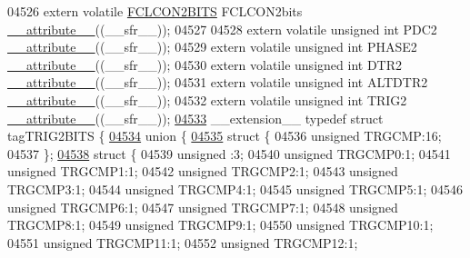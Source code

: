 \begin{DoxyCode}
04526 \textcolor{keyword}{extern} \textcolor{keyword}{volatile} \hyperlink{a00014_d3/def/a00446}{FCLCON2BITS} FCLCON2bits \hyperlink{a00015_a493c46f03454991ccc5aa7a6e1dfb2a7}{\_\_attribute\_\_}((\_\_sfr\_\_));
04527 
04528 \textcolor{keyword}{extern} \textcolor{keyword}{volatile} \textcolor{keywordtype}{unsigned} \textcolor{keywordtype}{int}  PDC2 \hyperlink{a00015_a493c46f03454991ccc5aa7a6e1dfb2a7}{\_\_attribute\_\_}((\_\_sfr\_\_));
04529 \textcolor{keyword}{extern} \textcolor{keyword}{volatile} \textcolor{keywordtype}{unsigned} \textcolor{keywordtype}{int}  PHASE2 \hyperlink{a00015_a493c46f03454991ccc5aa7a6e1dfb2a7}{\_\_attribute\_\_}((\_\_sfr\_\_));
04530 \textcolor{keyword}{extern} \textcolor{keyword}{volatile} \textcolor{keywordtype}{unsigned} \textcolor{keywordtype}{int}  DTR2 \hyperlink{a00015_a493c46f03454991ccc5aa7a6e1dfb2a7}{\_\_attribute\_\_}((\_\_sfr\_\_));
04531 \textcolor{keyword}{extern} \textcolor{keyword}{volatile} \textcolor{keywordtype}{unsigned} \textcolor{keywordtype}{int}  ALTDTR2 \hyperlink{a00015_a493c46f03454991ccc5aa7a6e1dfb2a7}{\_\_attribute\_\_}((\_\_sfr\_\_));
04532 \textcolor{keyword}{extern} \textcolor{keyword}{volatile} \textcolor{keywordtype}{unsigned} \textcolor{keywordtype}{int}  TRIG2 \hyperlink{a00015_a493c46f03454991ccc5aa7a6e1dfb2a7}{\_\_attribute\_\_}((\_\_sfr\_\_));
\hypertarget{a00015_source_l04533}{}\hyperlink{a00014}{04533} \_\_extension\_\_ \textcolor{keyword}{typedef} \textcolor{keyword}{struct }tagTRIG2BITS \{
\hypertarget{a00015_source_l04534}{}\hyperlink{a00015}{04534}   \textcolor{keyword}{union }\{
\hypertarget{a00015_source_l04535}{}\hyperlink{a00015}{04535}     \textcolor{keyword}{struct }\{
04536       \textcolor{keywordtype}{unsigned} TRGCMP:16;
04537     \};
\hypertarget{a00015_source_l04538}{}\hyperlink{a00015}{04538}     \textcolor{keyword}{struct }\{
04539       \textcolor{keywordtype}{unsigned} :3;
04540       \textcolor{keywordtype}{unsigned} TRGCMP0:1;
04541       \textcolor{keywordtype}{unsigned} TRGCMP1:1;
04542       \textcolor{keywordtype}{unsigned} TRGCMP2:1;
04543       \textcolor{keywordtype}{unsigned} TRGCMP3:1;
04544       \textcolor{keywordtype}{unsigned} TRGCMP4:1;
04545       \textcolor{keywordtype}{unsigned} TRGCMP5:1;
04546       \textcolor{keywordtype}{unsigned} TRGCMP6:1;
04547       \textcolor{keywordtype}{unsigned} TRGCMP7:1;
04548       \textcolor{keywordtype}{unsigned} TRGCMP8:1;
04549       \textcolor{keywordtype}{unsigned} TRGCMP9:1;
04550       \textcolor{keywordtype}{unsigned} TRGCMP10:1;
04551       \textcolor{keywordtype}{unsigned} TRGCMP11:1;
04552       \textcolor{keywordtype}{unsigned} TRGCMP12:1;

\end{DoxyCode}
